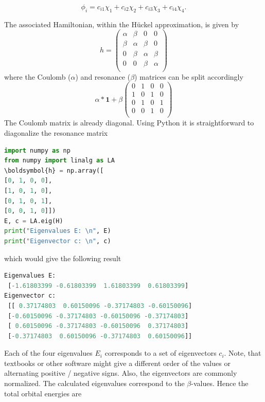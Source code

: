 \documentclass{article}
\begin{document}
\begin{equation}
\phi_i = c_{i1}\chi_1 + c_{i2}\chi_2 + c_{i3}\chi_3 + c_{i4}\chi_4.
\end{equation} 

The associated Hamiltonian, within the H\"uckel approximation, is given by
%
\begin{equation}
h =
\begin{pmatrix}
\alpha & \beta & 0 & 0 \\
\beta & \alpha & \beta & 0  \\
0 & \beta & \alpha & \beta  \\
0 & 0 & \beta & \alpha \\
\end{pmatrix}
\end{equation}
%
where the Coulomb ($\alpha$) and resonance ($\beta$) matrices can be split accordingly
%
\begin{equation}
\alpha * \boldsymbol{1} + \beta
\begin{pmatrix}
0 & 1 & 0 & 0 \\
1 & 0 & 1 & 0 \\
0 & 1 & 0 & 1 \\
0 & 0 & 1 & 0 \\
\end{pmatrix}
\end{equation}
%
The Coulomb matrix is already diagonal. Using Python it is straightforward to diagonalize the resonance matrix
%
\begin{lstlisting}[language=Python,label={lst:python_butadiene}]
import numpy as np
from numpy import linalg as LA
\boldsymbol{h} = np.array([
[0, 1, 0, 0],
[1, 0, 1, 0],
[0, 1, 0, 1],
[0, 0, 1, 0]])
E, c = LA.eig(H)
print("Eigenvalues E: \n", E)
print("Eigenvector c: \n", c)
\end{lstlisting}
%
which would give the following result
%
\begin{lstlisting}[language=Python]
Eigenvalues E: 
 [-1.61803399 -0.61803399  1.61803399  0.61803399]
Eigenvector c: 
 [[ 0.37174803  0.60150096 -0.37174803 -0.60150096]
 [-0.60150096 -0.37174803 -0.60150096 -0.37174803]
 [ 0.60150096 -0.37174803 -0.60150096  0.37174803]
 [-0.37174803  0.60150096 -0.37174803  0.60150096]]
\end{lstlisting}
%
Each of the four eigenvalues $E_i$ corresponds to a set of eigenvectors $c_i$. Note, that textbooks or other software might give a different order of the values or alternating positive / negative signs. Also, the eigenvectors are commonly normalized. The calculated eigenvalues correspond to the $\beta$-values. Hence the total orbital energies are
\end{document}
